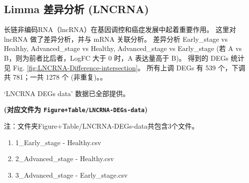 \documentclass[
]{article}
\providecommand{\tightlist}{%
  \setlength{\itemsep}{0pt}\setlength{\parskip}{0pt}}
\begin{document}
\begin{center}\vspace{1.5cm}\end{center}

\hypertarget{limma-ux5deeux5f02ux5206ux6790-lncrna}{%
\subsection{Limma 差异分析 (LNCRNA)}\label{limma-ux5deeux5f02ux5206ux6790-lncrna}}

长链非编码RNA（lncRNA）在基因调控和癌症发展中起着重要作用。
这里对 lncRNA 做了差异分析，并与 mRNA 关联分析。
差异分析 Early\_stage vs Healthy, Advanced\_stage vs Healthy, Advanced\_stage vs Early\_stage (若 A vs B，则为前者比后者，LogFC 大于 0 时，A 表达量高于 B)。
得到的 DEGs 统计见 Fig. \ref{fig:LNCRNA-Difference-intersection}。
所有上调 DEGs 有 539 个，下调共 781；一共 1278 个 (非重复)。。

\begin{center}\vspace{1.5cm}\end{center}

`LNCRNA DEGs data' 数据已全部提供。

\textbf{(对应文件为 \texttt{Figure+Table/LNCRNA-DEGs-data})}

\begin{center}\begin{tcolorbox}[colback=gray!10, colframe=gray!50, width=0.9\linewidth, arc=1mm, boxrule=0.5pt]注：文件夹Figure+Table/LNCRNA-DEGs-data共包含3个文件。

\begin{enumerate}\tightlist
\item 1\_Early\_stage - Healthy.csv
\item 2\_Advanced\_stage - Healthy.csv
\item 3\_Advanced\_stage - Early\_stage.csv
\end{enumerate}\end{tcolorbox}
\end{center}

\begin{center}\vspace{1.5cm}\end{center}

\begin{center}\vspace{1.5cm}\end{center}
\end{document}
